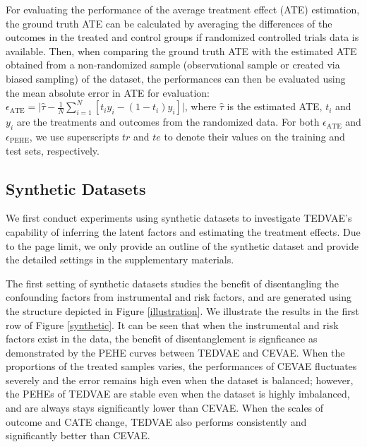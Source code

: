 \documentclass[letterpaper]{article} %
\begin{document}
For evaluating the performance of the average treatment effect (ATE) estimation, the ground truth ATE can be calculated by averaging the differences of the outcomes in the treated and control groups if randomized controlled trials data is available. Then, when comparing the ground truth ATE with the estimated ATE obtained from a non-randomized sample (observational sample or created via biased sampling) of the dataset, the performances can then be evaluated using the mean absolute error in ATE \cite{Hill2011,Shalit2016,Louizos2017,Yao2018_Twin} for evaluation: $\epsilon_{\text{ATE}} = \vert \hat{\tau} - \frac{1}{N}\sum\limits_{i=1}^N[t_i y_i - (1-t_i)y_i]\vert$,
where $\hat{\tau}$ is the estimated ATE, $t_i$ and $y_i$ are the treatments and outcomes from the randomized data. For both $\epsilon_{\text{ATE}}$ and $\epsilon_{\text{PEHE}}$, we use superscripts $tr$ and $te$ to denote their values on the training and test sets, respectively.


\subsection*{Synthetic Datasets}
We first conduct experiments using synthetic datasets to investigate TEDVAE's capability of inferring the latent factors and estimating the treatment effects. Due to the page limit, we only provide an outline of the synthetic dataset and provide the detailed settings in the supplementary materials.


The first setting of synthetic datasets studies the benefit of disentangling the confounding factors from instrumental and risk factors, and are generated using the structure depicted in Figure \ref{illustration}.
We illustrate the results in the first row of Figure \ref{synthetic}. It can be seen that when the instrumental and risk factors exist in the data, the benefit of disentanglement is signficance as demonstrated by the PEHE curves between TEDVAE and CEVAE. When the proportions of the treated samples varies, the performances of CEVAE fluctuates severely and the error remains high even when the dataset is balanced; however, the PEHEs of TEDVAE are stable even when the dataset is highly imbalanced, and are always stays significantly lower than CEVAE. When the scales of outcome and CATE change, TEDVAE also performs consistently and significantly better than CEVAE.
\end{document}
